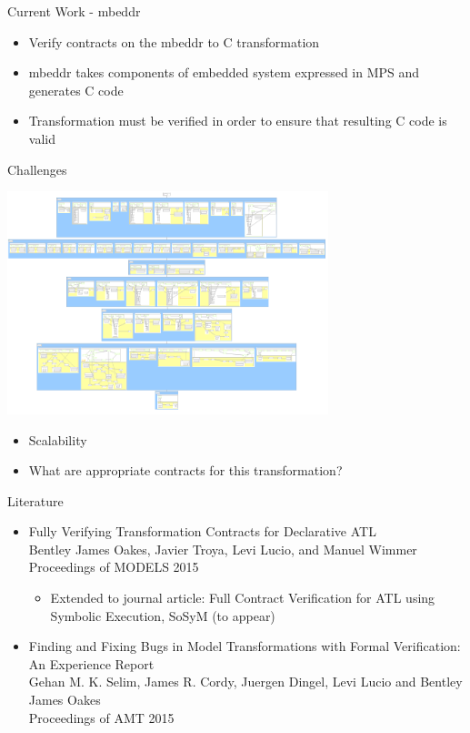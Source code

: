 \documentclass[xcolor=dvipsnames, 12pt, handout]{beamer}
\begin{document}
\begin{frame}{Current Work - mbeddr}

\begin{itemize}[<+->]
\item Verify contracts on the mbeddr  to C transformation
\item mbeddr takes components of embedded system expressed in MPS and generates C code
\item Transformation must be verified in order to ensure that resulting C code is valid
\end{itemize}
\end{frame}

\begin{frame}{Challenges}

\begin{center}
\includegraphics[width=0.7\textwidth]{figures/mbeddr}
\end{center}

\begin{itemize}
\item Scalability
\item What are appropriate contracts for this transformation?

\end{itemize}
\end{frame}

\begin{frame}{Literature}
\small
\begin{itemize}[<+->]

\item Fully Verifying Transformation Contracts for Declarative ATL\\
Bentley James Oakes, Javier Troya, Levi Lucio, and Manuel Wimmer\\
Proceedings of MODELS 2015
\begin{itemize}
\item Extended to journal article: Full Contract Verification for ATL using Symbolic Execution, SoSyM (to appear)
\end{itemize}
\item  Finding and Fixing Bugs in Model Transformations with Formal Verification: An Experience Report\\
Gehan M. K. Selim, James R. Cordy, Juergen Dingel, Levi Lucio and Bentley James Oakes\\
Proceedings of AMT 2015
\end{itemize}
\end{frame}
\end{document}
